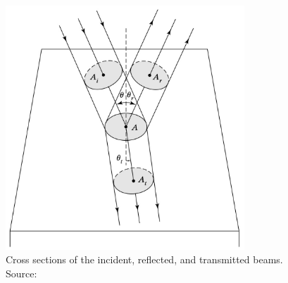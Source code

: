\begin{figure}
  \centering
  \includegraphics[width=0.8\textwidth]{Chapters/Figures/Chapter 2 Figures/CSA Example for the Incident, Reflected, and Transmitted Electromagnetic Waves.jpg}
  \caption[Cross sections of the incident, reflected, and transmitted beams]{Cross sections of the incident, reflected, and transmitted beams. Source: \cite{pedrotti_introduction_2007}}
  \label{fig: The CSA Example}
\end{figure}

